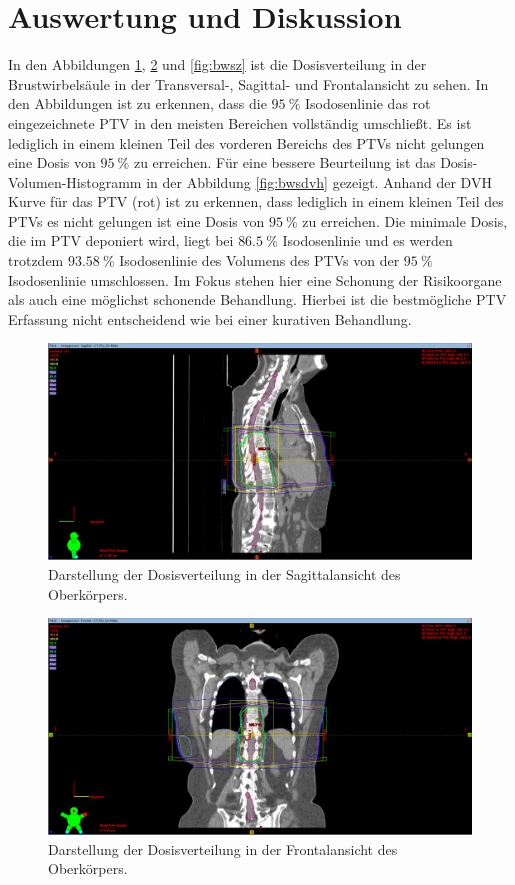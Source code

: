 \section{Auswertung und Diskussion}
In den Abbildungen \ref{fig:bwsx}, \ref{fig:bwsy} und \ref{fig:bwsz} ist die Dosisverteilung in der Brustwirbelsäule in der Transversal-, Sagittal- und Frontalansicht zu sehen. In den Abbildungen ist zu erkennen, dass die $\SI{95}{\percent}$ Isodosenlinie das rot eingezeichnete PTV in den meisten Bereichen vollständig umschließt. Es ist lediglich in einem kleinen Teil des vorderen Bereichs des PTVs nicht gelungen eine Dosis von $\SI{95}{\percent}$ zu erreichen. Für eine bessere Beurteilung ist das Dosis-Volumen-Histogramm in der Abbildung \ref{fig:bwsdvh} gezeigt. Anhand der DVH Kurve für das PTV (rot) ist zu erkennen, dass lediglich in einem kleinen Teil des PTVs es nicht gelungen ist eine Dosis von $\SI{95}{\percent}$ zu erreichen. Die minimale Dosis, die im PTV deponiert wird, liegt bei  $\SI{86.5}{\percent}$ Isodosenlinie und es werden trotzdem  $\SI{93.58}{\percent}$ Isodosenlinie des Volumens des PTVs von der  $\SI{95}{\percent}$ Isodosenlinie umschlossen.
Im Fokus stehen hier eine Schonung der Risikoorgane als auch eine möglichst schonende Behandlung. Hierbei ist die bestmögliche PTV Erfassung nicht entscheidend wie bei einer kurativen Behandlung.

\begin{figure}[h!]
	\centering
	\includegraphics[width=0.7\linewidth]{Bilder/BWS_X}
	\caption{Darstellung der Dosisverteilung in der Sagittalansicht des Oberkörpers.}
	\label{fig:bwsx}
\end{figure}

\begin{figure}[h!]
	\centering
	\includegraphics[width=0.7\linewidth]{Bilder/BWS_Y}
	\caption{Darstellung der Dosisverteilung in der Frontalansicht des Oberkörpers.}
	\label{fig:bwsy}
\end{figure}

